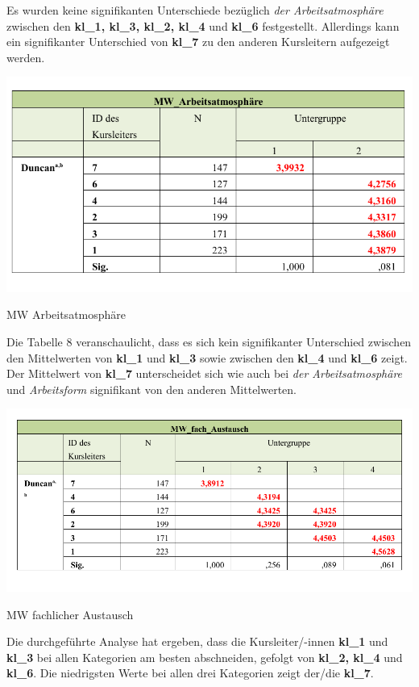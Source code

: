 \documentclass[12pt,a4paper]{article}
\begin{document}
Es wurden keine signifikanten Unterschiede bezüglich \textit{der Arbeitsatmosphäre} zwischen den \textbf{kl\_1, kl\_3, kl\_2, kl\_4} und \textbf{kl\_6} festgestellt. Allerdings kann ein signifikanter Unterschied von \textbf{kl\_7} zu den anderen Kursleitern aufgezeigt werden. 


\begin{table}[!ht]
\includegraphics[scale=1.0]{tab02.pdf}
\caption{MW Arbeitsatmosphäre}
\label{tab.7}
\end{table}
\FloatBarrier


Die Tabelle 8 veranschaulicht, dass es sich kein signifikanter Unterschied zwischen den Mittelwerten von \textbf{kl\_1} und \textbf{kl\_3} sowie zwischen den \textbf{kl\_4} und \textbf{kl\_6} zeigt. Der Mittelwert von \textbf{kl\_7} unterscheidet sich wie auch bei \textit{der Arbeitsatmosphäre} und \textit{Arbeitsform} signifikant von den anderen Mittelwerten.

\begin{table}[!ht]
\includegraphics[scale=0.82]{tab03.pdf}
\caption{MW fachlicher Austausch}
\label{tab.8}
\end{table}
\FloatBarrier

Die durchgeführte Analyse hat ergeben, dass die Kursleiter/-innen \textbf{kl\_1} und \textbf{kl\_3} bei allen Kategorien am besten abschneiden, gefolgt von \textbf{kl\_2, kl\_4} und \textbf{kl\_6}. Die niedrigsten Werte bei allen drei Kategorien zeigt der/die \textbf{kl\_7}.
\end{document}
